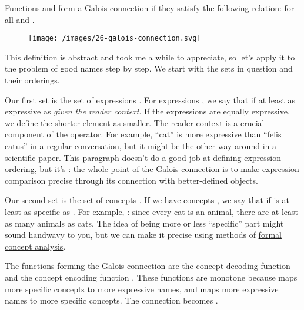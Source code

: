 \documentclass{article}
\begin{document}
Functions  and  form a Galois connection if they satisfy the following relation:
 for all  and .

\begin{figure}[grayscale-diagram,medium-size]
  \texttt{[image: /images/26-galois-connection.svg]}
\end{figure}

This definition is abstract and took me a while to appreciate, so let's apply it to the problem of good names step by step.
We start with the sets in question and their orderings.

Our first set is the set of expressions .
For expressions , we say that  if  at least as expressive as  \emph{given the reader context}.
If the expressions are equally expressive, we define the shorter element as smaller.
The reader context is a crucial component of the \math{\leq} operator.
For example, ``cat'' is more expressive than ``felis catus'' in a regular conversation, but it might be the other way around in a scientific paper.
This paragraph doesn't do a good job at defining expression ordering, but it's : the whole point of the Galois connection is to make expression comparison precise through its connection with better-defined objects.

Our second set is the set of concepts .
If we have concepts , we say that  if  is at least as specific as .
For example, : since every cat is an animal, there are at least as many animals as cats.
The idea of being more or less ``specific'' part might sound handwavy to you, but we can make it precise using methods of \href{https://en.wikipedia.org/wiki/Formal_concept_analysis}{formal concept analysis}.

The functions forming the Galois connection are the concept decoding function  and the concept encoding function .
These functions are monotone because  maps more specific concepts to more expressive names, and  maps more expressive names to more specific concepts.
The connection becomes .
\end{document}
